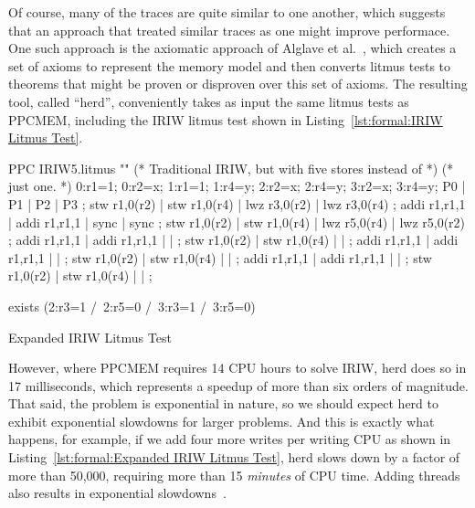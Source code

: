 Of course, many of the traces are quite similar to one another, which
suggests that an approach that treated similar traces as one might
improve performace.
One such approach is the axiomatic approach of
Alglave et al.~\cite{Alglave:2014:HCM:2594291.2594347},
which creates a set of axioms to represent the memory model and then
converts litmus tests to theorems that might be proven or disproven
over this set of axioms.
The resulting tool, called ``herd'',  conveniently takes as input the
same litmus tests as PPCMEM, including the IRIW litmus test shown in
Listing~\ref{lst:formal:IRIW Litmus Test}.

\begin{listing}[tb]
\begin{linelabel}
\begin{VerbatimL}[commandchars=\%\@\$]
PPC IRIW5.litmus
""
(* Traditional IRIW, but with five stores instead of *)
(* just one.                                         *)
{
0:r1=1; 0:r2=x;
1:r1=1;         1:r4=y;
        2:r2=x; 2:r4=y;
        3:r2=x; 3:r4=y;
}
P0           | P1           | P2           | P3           ;
stw r1,0(r2) | stw r1,0(r4) | lwz r3,0(r2) | lwz r3,0(r4) ;
addi r1,r1,1 | addi r1,r1,1 | sync         | sync         ;
stw r1,0(r2) | stw r1,0(r4) | lwz r5,0(r4) | lwz r5,0(r2) ;
addi r1,r1,1 | addi r1,r1,1 |              |              ;
stw r1,0(r2) | stw r1,0(r4) |              |              ;
addi r1,r1,1 | addi r1,r1,1 |              |              ;
stw r1,0(r2) | stw r1,0(r4) |              |              ;
addi r1,r1,1 | addi r1,r1,1 |              |              ;
stw r1,0(r2) | stw r1,0(r4) |              |              ;

exists
(2:r3=1 /\ 2:r5=0 /\ 3:r3=1 /\ 3:r5=0)
\end{VerbatimL}
\end{linelabel}
\caption{Expanded IRIW Litmus Test}
\label{lst:formal:Expanded IRIW Litmus Test}
\end{listing}

However, where PPCMEM requires 14 CPU hours to solve IRIW, herd does so
in 17 milliseconds, which represents a speedup of more than six orders
of magnitude.
That said, the problem is exponential in nature, so we should expect
herd to exhibit exponential slowdowns for larger problems.
And this is exactly what happens, for example, if we add four more writes
per writing CPU as shown in
Listing~\ref{lst:formal:Expanded IRIW Litmus Test},
herd slows down by a factor of more than 50,000, requiring more than
15 \emph{minutes} of CPU time.
Adding threads also results in exponential
slowdowns~\cite{PaulEMcKenney2014weakaxiom}.

